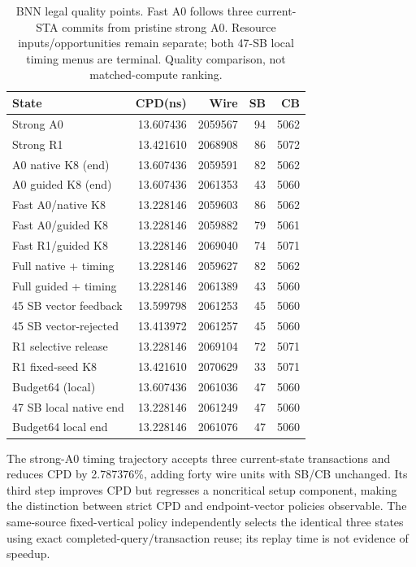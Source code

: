 \documentclass[conference,10pt]{IEEEtran}
\begin{document}
\begin{table}[t]
\centering\caption{BNN legal quality points. Fast A0 follows three current-STA commits from pristine strong A0. Resource inputs/opportunities remain separate; both 47-SB local timing menus are terminal. Quality comparison, not matched-compute ranking.}
\label{tab:bnn}
\small
\begin{tabular}{lrrrr}\hline
State & CPD(ns) & Wire & SB & CB\\\hline
Strong A0 &13.607436&2059567&94&5062\\
Strong R1 &13.421610&2068908&86&5072\\
A0 native K8 (end) &13.607436&2059591&82&5062\\
A0 guided K8 (end) &13.607436&2061353&43&5060\\
Fast A0/native K8 &13.228146&2059603&86&5062\\
Fast A0/guided K8 &13.228146&2059882&79&5061\\
Fast R1/guided K8 &13.228146&2069040&74&5071\\
Full native + timing &13.228146&2059627&82&5062\\
Full guided + timing &13.228146&2061389&43&5060\\
45 SB vector feedback &13.599798&2061253&45&5060\\
45 SB vector-rejected &13.413972&2061257&45&5060\\
R1 selective release &13.228146&2069104&72&5071\\
R1 fixed-seed K8 &13.421610&2070629&33&5071\\
Budget64 (local) &13.607436&2061036&47&5060\\
47 SB local native end &13.228146&2061249&47&5060\\
Budget64 local end &13.228146&2061076&47&5060\\\hline
\end{tabular}
\end{table}
The strong-A0 timing trajectory accepts three current-state transactions and reduces CPD by 2.787376\%, adding forty wire units with SB/CB unchanged. Its third step improves CPD but regresses a noncritical setup component, making the distinction between strict CPD and endpoint-vector policies observable. The same-source fixed-vertical policy independently selects the identical three states using exact completed-query/transaction reuse; its replay time is not evidence of speedup.
\end{document}
